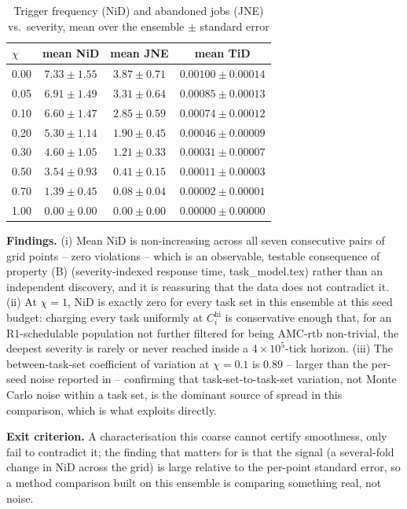 \begin{table}[h]
\centering
\caption{Trigger frequency (NiD) and abandoned jobs (JNE) vs.\ severity, mean over the ensemble $\pm$ standard error}
\begin{tabular}{lccc}
\toprule
$\chi$ & mean NiD & mean JNE & mean TiD \\
\midrule
0.00 & $7.33 \pm 1.55$ & $3.87 \pm 0.71$ & $0.00100 \pm 0.00014$ \\
0.05 & $6.91 \pm 1.49$ & $3.31 \pm 0.64$ & $0.00085 \pm 0.00013$ \\
0.10 & $6.60 \pm 1.47$ & $2.85 \pm 0.59$ & $0.00074 \pm 0.00012$ \\
0.20 & $5.30 \pm 1.14$ & $1.90 \pm 0.45$ & $0.00046 \pm 0.00009$ \\
0.30 & $4.60 \pm 1.05$ & $1.21 \pm 0.33$ & $0.00031 \pm 0.00007$ \\
0.50 & $3.54 \pm 0.93$ & $0.41 \pm 0.15$ & $0.00011 \pm 0.00003$ \\
0.70 & $1.39 \pm 0.45$ & $0.08 \pm 0.04$ & $0.00002 \pm 0.00001$ \\
1.00 & $0.00 \pm 0.00$ & $0.00 \pm 0.00$ & $0.00000 \pm 0.00000$ \\
\bottomrule
\end{tabular}
\end{table}

\textbf{Findings.} (i) Mean NiD is non-increasing across all seven consecutive
pairs of grid points -- zero violations -- which is an observable, testable
consequence of property (B) (severity-indexed response time, task\_model.tex) rather than an
independent discovery, and it is reassuring that the data does not contradict
it. (ii) At $\chi = 1$, NiD is exactly zero for every task set in this
ensemble at this seed budget: charging every task uniformly at
$C_i^{\mathrm{hi}}$ is conservative enough that, for an R1-schedulable
population not further filtered for being AMC-rtb non-trivial, the deepest
severity is rarely or never reached inside a $4 \times 10^5$-tick horizon.
(iii) The between-task-set coefficient of variation at $\chi = 0.1$ is
$\mathbf{0.89}$ -- larger than the per-seed noise reported in
 -- confirming that task-set-to-task-set variation, not
Monte Carlo noise within a task set, is the dominant source of spread in this
comparison, which is what  exploits directly.

\textbf{Exit criterion.} A characterisation this coarse cannot certify
smoothness, only fail to contradict it; the finding that matters for
 is that the signal (a several-fold change in NiD across
the grid) is large relative to the per-point standard error, so a method
comparison built on this ensemble is comparing something real, not noise.

